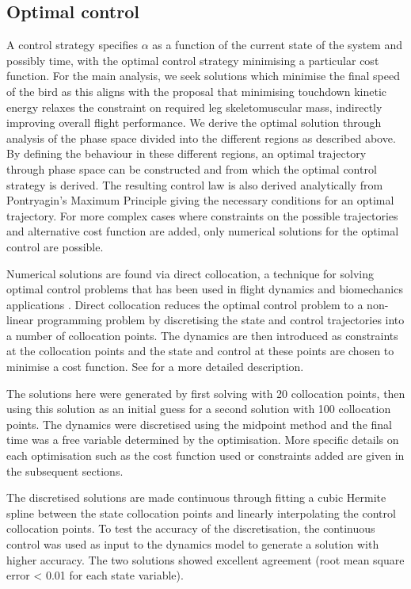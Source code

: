 \subsection{Optimal control}\label{sec-methods-optcontrol}

A control strategy specifies $\alpha$ as a function of the current state of the system and possibly time, with the optimal control strategy minimising a particular cost function. For the main analysis, we seek solutions which minimise the final speed of the bird as this aligns with the proposal that minimising touchdown kinetic energy relaxes the constraint on required leg skeletomuscular mass, indirectly improving overall flight performance. We derive the optimal solution through analysis of the phase space divided into the different regions \cite{robertsPropellingTorqueControlled1979} as described above. By defining the behaviour in these different regions, an optimal trajectory through phase space can be constructed and from which the optimal control strategy is derived. The resulting control law is also derived analytically from Pontryagin's Maximum Principle \cite{kirkOptimalControlTheory2004} giving the necessary conditions for an optimal trajectory. For more complex cases where constraints on the possible trajectories and alternative cost function are added, only numerical solutions for the optimal control are possible.

Numerical solutions are found via direct collocation, a technique for solving optimal control problems that has been used in flight dynamics \cite{mooreRobustPoststallPerching2014,alikhanFlightDynamicsOptimization2013} and biomechanics applications \cite{porsaDirectMethodsPredicting2016,bishopPredictiveSimulationsMusculoskeletal2021}. Direct collocation reduces the optimal control problem to a non-linear programming problem by discretising the state and control trajectories into a number of collocation points. The dynamics are then introduced as constraints at the collocation points and the state and control at these points are chosen to minimise a cost function. See \cite{bettsOptimalControl} for a more detailed description.

The solutions here were generated by first solving with 20 collocation points, then using this solution as an initial guess for a second solution with 100 collocation points. The dynamics were discretised using the midpoint method and the final time was a free variable determined by the optimisation. More specific details on each optimisation such as the cost function used or constraints added are given in the subsequent sections.

The discretised solutions are made continuous through fitting a cubic Hermite spline between the state collocation points and linearly interpolating the control collocation points. To test the accuracy of the discretisation, the continuous control was used as input to the dynamics model to generate a solution with higher accuracy. The two solutions showed excellent agreement (root mean square error < 0.01 for each state variable).
